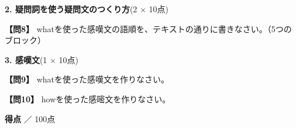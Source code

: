 \noindent\textbf{2. 疑問詞を使う疑問文のつくり方}(2 $\times$ 10点)

\noindent\textbf{【問8】} whatを使った感嘆文の語順を、テキストの通りに書きなさい。（5つのブロック）

\testqsep

\noindent\textbf{3. 感嘆文}(1 $\times$ 10点)

\noindent\textbf{【問9】} whatを使った感嘆文を作りなさい。

\testqsep

\noindent\textbf{【問10】} howを使った感嘧文を作りなさい。

\testqsep

\begin{flushright}
\textbf{得点} \underline{\hspace{8em}} ／ 100点
\end{flushright}
